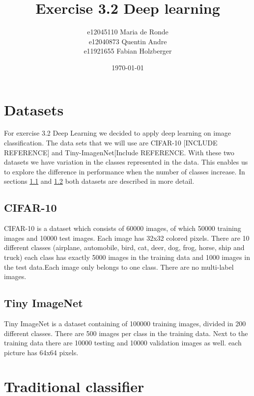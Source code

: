 \documentclass[11pt]{article}
\title{Exercise 3.2 Deep learning}
\author{e12045110 Maria de Ronde \\ e12040873  Quentin Andre  \\ e11921655 Fabian Holzberger}
\date{\today}
\begin{document}
\graphicspath{{./figures/}}
\maketitle

%
\section{Datasets}
For exercise 3.2 Deep Learning we decided to apply deep learning on image classification. The data sets that we will use are CIFAR-10 [INCLUDE REFERENCE] and Tiny-ImagenNet[Include REFERENCE. With these two datasets we have variation in the classes represented in the data. This  enables us to explore the difference in performance when the number of classes increase. In sections \ref{Sec_Cifar-10} and \ref{Sec_ImageNet} both datasets are described in more detail. 

\subsection{CIFAR-10}\label{Sec_Cifar-10}
CIFAR-10 is a dataset which consists of 60000 images, of which 50000 training images and 10000 test images. Each image has 32x32 colored pixels.
There are 10 different classes (airplane, automobile, bird, cat, deer, dog, frog, horse, ship and truck) each class has exactly 5000 images in the training data and 1000 images in the test data.Each image only belongs to one class. There are no multi-label images. 

\subsection{Tiny ImageNet}\label{Sec_ImageNet}
Tiny ImageNet is a dataset containing of 100000 training images, divided in 200 different classes. There are 500 images per class in the training data. Next to the training data there are 10000 testing and 10000 validation images as well. each picture has 64x64 pixels.     

\section{Traditional classifier}
\end{document}
